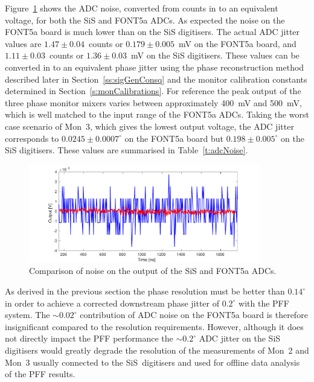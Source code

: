Figure~\ref{f:digitiserNosie} shows the ADC noise, converted from counts in to an equivalent voltage, for both the SiS and FONT5a ADCs. As expected the noise on the FONT5a board is much lower than on the SiS digitisers. The actual ADC jitter values are \(1.47\pm0.04\)~counts or \(0.179\pm0.005\)~mV on the FONT5a board, and \(1.11\pm0.03\)~counts or \(1.36\pm0.03\)~mV on the SiS digitisers. These values can be converted in to an equivalent phase jitter using the phase reconstruction method described later in Section~\ref{ss:sigGenConsq} and the monitor calibration constants determined in Section~\ref{s:monCalibrations}. For reference the peak output of the three phase monitor mixers varies between approximately 400~mV and 500~mV, which is well matched to the input range of the FONT5a ADCs. Taking the worst case scenario of Mon~3, which gives the lowest output voltage, the ADC jitter corresponds to \(0.0245\pm0.0007^\circ\) on the FONT5a board but \(0.198\pm0.005^\circ\) on the SiS digitisers. These values are summarised in Table~\ref{t:adcNoise}.

\begin{figure}
  \centering
  \includegraphics[width=0.9\textwidth]{Figures/phaseMons/digitiserNosie}
  \caption{Comparison of noise on the output of the SiS and FONT5a ADCs.}
  \label{f:digitiserNosie}
\end{figure}

As derived in the previous section the phase resolution must be better than \(0.14^\circ\) in order to achieve a corrected downstream phase jitter of \(0.2^\circ\) with the PFF system. The \(\sim0.02^\circ\) contribution of ADC noise on the FONT5a board is therefore insignificant compared to the resolution requirements. However, although it does not directly impact the PFF performance the \(\sim0.2^\circ\) ADC jitter on the SiS digitisers would greatly degrade the resolution of the measurements of Mon~2 and Mon~3 usually connected to the SiS~digitisers and used for offline data analysis of the PFF results. 

